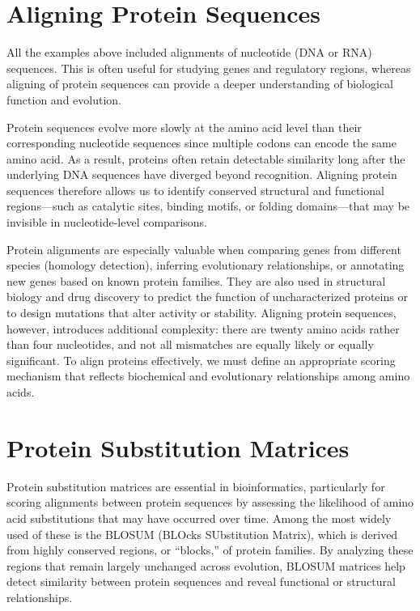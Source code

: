 \section{Aligning Protein Sequences}

All the examples above included alignments of nucleotide (DNA or RNA) sequences. This is often useful for studying genes and regulatory regions, whereas aligning of protein sequences can provide a deeper understanding of biological function and evolution. 

Protein sequences evolve more slowly at the amino acid level than their corresponding nucleotide sequences since multiple codons can encode the same amino acid. As a result, proteins often retain detectable similarity long after the underlying DNA sequences have diverged beyond recognition. Aligning protein sequences therefore allows us to identify conserved structural and functional regions—such as catalytic sites, binding motifs, or folding domains—that may be invisible in nucleotide-level comparisons.

Protein alignments are especially valuable when comparing genes from different species (homology detection), inferring evolutionary relationships, or annotating new genes based on known protein families. They are also used in structural biology and drug discovery to predict the function of uncharacterized proteins or to design mutations that alter activity or stability. Aligning protein sequences, however, introduces additional complexity: there are twenty amino acids rather than four nucleotides, and not all mismatches are equally likely or equally significant. To align proteins effectively, we must define an appropriate scoring mechanism that reflects biochemical and evolutionary relationships among amino acids.

\section{Protein Substitution Matrices}

Protein substitution matrices are essential in bioinformatics, particularly for scoring alignments between protein sequences by assessing the likelihood of amino acid substitutions that may have occurred over time. Among the most widely used of these is the BLOSUM (BLOcks SUbstitution Matrix),
which is derived from highly conserved regions, or “blocks,” of protein families. By analyzing these regions that remain largely unchanged across evolution, BLOSUM matrices help detect similarity between protein sequences and reveal functional or structural relationships.

